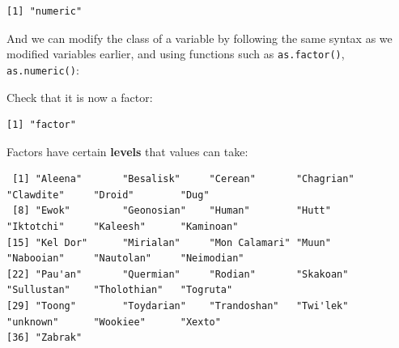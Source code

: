 \documentclass[]{book}
\newenvironment{Shaded}{\begin{snugshade}}{\end{snugshade}}
\newcommand{\CommentTok}[1]{\textcolor[rgb]{0.56,0.35,0.01}{\textit{#1}}}
\newcommand{\KeywordTok}[1]{\textcolor[rgb]{0.13,0.29,0.53}{\textbf{#1}}}
\newcommand{\NormalTok}[1]{#1}
\newcommand{\OperatorTok}[1]{\textcolor[rgb]{0.81,0.36,0.00}{\textbf{#1}}}
\newcommand{\StringTok}[1]{\textcolor[rgb]{0.31,0.60,0.02}{#1}}
\begin{document}
\begin{Shaded}
\end{Shaded}

\begin{verbatim}
[1] "numeric"
\end{verbatim}

And we can modify the class of a variable by following the same syntax as we modified variables earlier, and using functions such as \texttt{as.factor()}, \texttt{as.numeric()}:

\begin{Shaded}
\end{Shaded}

Check that it is now a factor:

\begin{Shaded}
\end{Shaded}

\begin{verbatim}
[1] "factor"
\end{verbatim}

Factors have certain \textbf{levels} that values can take:

\begin{Shaded}
\end{Shaded}

\begin{verbatim}
 [1] "Aleena"       "Besalisk"     "Cerean"       "Chagrian"     "Clawdite"     "Droid"        "Dug"         
 [8] "Ewok"         "Geonosian"    "Human"        "Hutt"         "Iktotchi"     "Kaleesh"      "Kaminoan"    
[15] "Kel Dor"      "Mirialan"     "Mon Calamari" "Muun"         "Nabooian"     "Nautolan"     "Neimodian"   
[22] "Pau'an"       "Quermian"     "Rodian"       "Skakoan"      "Sullustan"    "Tholothian"   "Togruta"     
[29] "Toong"        "Toydarian"    "Trandoshan"   "Twi'lek"      "unknown"      "Wookiee"      "Xexto"       
[36] "Zabrak"      
\end{verbatim}
\end{document}
